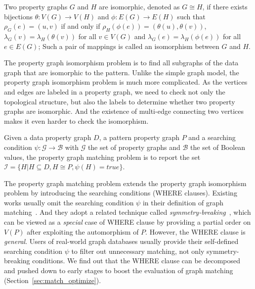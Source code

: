 \begin{definition}
  Two property graphs $G$ and $H$ are isomorphic, denoted as $G \cong H$,
  if there exists bijections $\theta: V(G) \rightarrow V(H)$ and $\phi: E(G) \rightarrow E(H)$ such that
  $\rho_G(e) = (u, v)$ if and only if $\rho_H(\phi(e)) = (\theta(u), \theta(v))$,
  $\lambda_G(v) = \lambda_H(\theta(v))$ for all $v \in V(G)$
  and $\lambda_G(e) = \lambda_H(\phi(e))$ for all $e \in E(G)$;
  Such a pair of mappings is called an isomorphism between $G$ and $H$.
\end{definition}
The property graph isomorphism problem is to find all subgraphs of the data graph that are isomorphic to the pattern.
Unlike the simple graph model, the property graph isomorphism problem is much more complicated.
As the vertices and edges are labeled in a property graph, we need to check  not only the topological structure,
but also the labels to determine whether two property graphs are isomorphic.
And the existence of multi-edge connecting two vertices makes it even harder to check the isomorphism.
\begin{definition}\label{def:property_graph_matching}
  Given a data property graph $D$, a pattern property graph $P$ and a searching condition $\psi: \mathcal{G} \rightarrow \mathcal{B}$ with $\mathcal{G}$ the set of property graphs and $\mathcal{B}$ the set of Boolean values,
  the property graph matching problem is to report the set $\mathcal{I} = \{H | H \subseteq D, H \cong P, \psi(H) = true\}$.
\end{definition}
The property graph matching problem extends the property graph isomorphism problem by introducing the searching conditions (WHERE clauses).
Existing works usually omit the searching condition $\psi$ in their definition of graph matching~\cite{DBLP:conf/sigmod/ShaoCCMYX14,DBLP:journals/pvldb/LaiQLC15,DBLP:conf/sigmod/KimLBHLKJ16,DBLP:journals/pvldb/QiaoZC17}.
And they adopt a related technique called \emph{symmetry-breaking}~\cite{DBLP:conf/recomb/GrochowK07},
which can be viewed as a \emph{special} case of WHERE clause by providing a partial order on $V(P)$ after exploiting the automorphism of $P$.
However, the WHERE clause is \emph{general}. Users of real-world graph databases usually provide their self-defined searching condition $\psi$ to filter out unnecessary matching, not only symmetry-breaking conditions.
We find out that the WHERE clause can be decomposed and pushed down to early stages to boost the evaluation of graph matching (Section~\ref{sec:match_optimize}).
